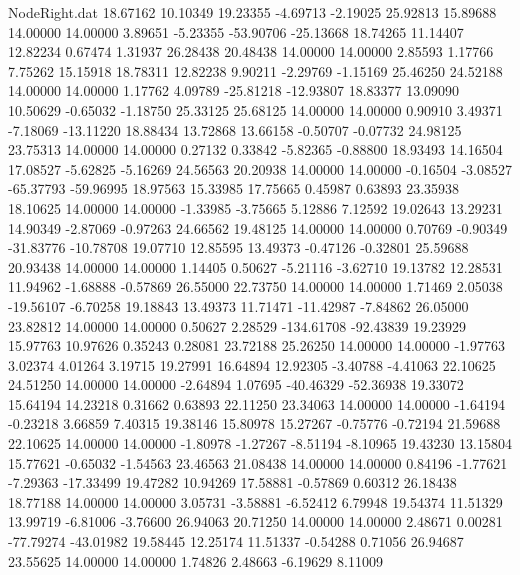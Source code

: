 \begin{filecontents}{NodeRight.dat}
  18.67162   10.10349   19.23355    -4.69713   -2.19025   25.92813   15.89688   14.00000   14.00000    3.89651   -5.23355  -53.90706  -25.13668
  18.74265   11.14407   12.82234     0.67474    1.31937   26.28438   20.48438   14.00000   14.00000    2.85593    1.17766    7.75262   15.15918
  18.78311   12.82238    9.90211    -2.29769   -1.15169   25.46250   24.52188   14.00000   14.00000    1.17762    4.09789  -25.81218  -12.93807
  18.83377   13.09090   10.50629    -0.65032   -1.18750   25.33125   25.68125   14.00000   14.00000    0.90910    3.49371   -7.18069  -13.11220
  18.88434   13.72868   13.66158    -0.50707   -0.07732   24.98125   23.75313   14.00000   14.00000    0.27132    0.33842   -5.82365   -0.88800
  18.93493   14.16504   17.08527    -5.62825   -5.16269   24.56563   20.20938   14.00000   14.00000   -0.16504   -3.08527  -65.37793  -59.96995
  18.97563   15.33985   17.75665     0.45987    0.63893   23.35938   18.10625   14.00000   14.00000   -1.33985   -3.75665    5.12886    7.12592
  19.02643   13.29231   14.90349    -2.87069   -0.97263   24.66562   19.48125   14.00000   14.00000    0.70769   -0.90349  -31.83776  -10.78708
  19.07710   12.85595   13.49373    -0.47126   -0.32801   25.59688   20.93438   14.00000   14.00000    1.14405    0.50627   -5.21116   -3.62710
  19.13782   12.28531   11.94962    -1.68888   -0.57869   26.55000   22.73750   14.00000   14.00000    1.71469    2.05038  -19.56107   -6.70258
  19.18843   13.49373   11.71471   -11.42987   -7.84862   26.05000   23.82812   14.00000   14.00000    0.50627    2.28529 -134.61708  -92.43839
  19.23929   15.97763   10.97626     0.35243    0.28081   23.72188   25.26250   14.00000   14.00000   -1.97763    3.02374    4.01264    3.19715
  19.27991   16.64894   12.92305    -3.40788   -4.41063   22.10625   24.51250   14.00000   14.00000   -2.64894    1.07695  -40.46329  -52.36938
  19.33072   15.64194   14.23218     0.31662    0.63893   22.11250   23.34063   14.00000   14.00000   -1.64194   -0.23218    3.66859    7.40315
  19.38146   15.80978   15.27267    -0.75776   -0.72194   21.59688   22.10625   14.00000   14.00000   -1.80978   -1.27267   -8.51194   -8.10965
  19.43230   13.15804   15.77621    -0.65032   -1.54563   23.46563   21.08438   14.00000   14.00000    0.84196   -1.77621   -7.29363  -17.33499
  19.47282   10.94269   17.58881    -0.57869    0.60312   26.18438   18.77188   14.00000   14.00000    3.05731   -3.58881   -6.52412    6.79948
  19.54374   11.51329   13.99719    -6.81006   -3.76600   26.94063   20.71250   14.00000   14.00000    2.48671    0.00281  -77.79274  -43.01982
  19.58445   12.25174   11.51337    -0.54288    0.71056   26.94687   23.55625   14.00000   14.00000    1.74826    2.48663   -6.19629    8.11009

\end{filecontents}
